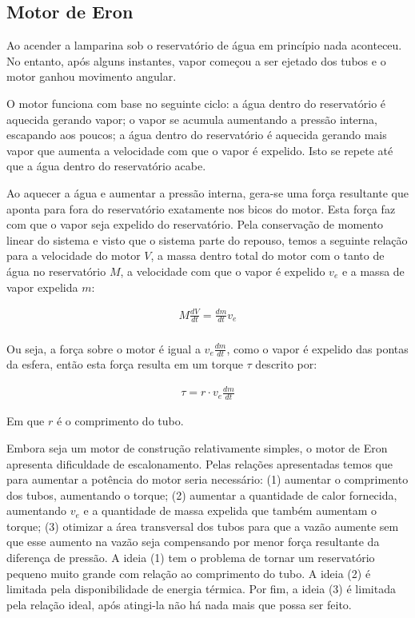 \subsection{Motor de Eron} %
Ao acender a lamparina sob o reservatório de água em princípio nada aconteceu. No entanto, após alguns instantes, vapor começou a ser ejetado dos tubos e o motor ganhou movimento angular. 

O motor funciona com base no seguinte ciclo: a água dentro do reservatório é aquecida gerando vapor; o vapor se acumula aumentando a pressão interna, escapando aos poucos; a água dentro do reservatório é aquecida gerando mais vapor que aumenta a velocidade com que o vapor é expelido. Isto se repete até que a água dentro do reservatório acabe.

Ao aquecer a água e aumentar a pressão interna, gera-se uma força resultante que aponta para fora do reservatório exatamente nos bicos do motor. Esta força faz com que o vapor seja expelido do reservatório. Pela conservação de momento linear do sistema e visto que o sistema parte do repouso, temos a seguinte relação para a velocidade do motor \(V\), a massa dentro total do motor com o tanto de água no reservatório \(M\), a velocidade com que o vapor é expelido \(v_e\) e a massa de vapor expelida \(m\):

\begin{align*}
    M \frac{dV}{dt}  = \frac{dm}{dt} v_e  \\
\end{align*}

Ou seja, a força sobre o motor é igual a \(v_e \frac{dm}{dt}\), como o vapor é expelido das pontas da esfera, então esta força resulta em um torque \(\tau\) descrito por:

\begin{align*}
    \tau = r \cdot v_e \frac{d m}{dt}  
\end{align*}

Em que \(r\) é o comprimento do tubo.

Embora seja um motor de construção relativamente simples, o motor de Eron apresenta dificuldade de escalonamento. Pelas relações apresentadas temos que para aumentar a potência do motor seria necessário: (1) aumentar o comprimento dos tubos, aumentando o torque; (2) aumentar a quantidade de calor fornecida,  aumentando \(v_e\) e a quantidade de massa expelida que também aumentam o torque; (3) otimizar a área transversal dos tubos para que a vazão aumente sem que esse aumento na vazão seja compensando por menor força resultante da diferença de pressão. A ideia (1) tem o problema de tornar um reservatório pequeno muito grande com relação ao comprimento do tubo. A ideia (2) é limitada pela disponibilidade de energia térmica. Por fim, a ideia (3) é limitada pela relação ideal, após atingi-la não há nada mais que possa ser feito.

